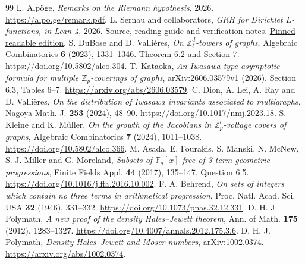\begin{thebibliography}{99}\small
{} L. Alpöge, \emph{Remarks on the Riemann hypothesis},
2026. \url{https://alpo.ge/remark.pdf}.
 L. Sernau and collaborators, \emph{GRH for Dirichlet
$L$-functions, in Lean 4}, 2026. Source, reading guide and verification
notes. \href{https://github.com/lsernau/grh-lean/tree/72fead102f663d5c7a407964a13dc0cf9d977207/grh}{Pinned readable edition}.
 S. DuBose and D. Vallières, \emph{On $\mathbb Z_\ell^d$-towers
of graphs}, Algebraic Combinatorics \textbf{6} (2023), 1331--1346.
Theorem 6.2 and Section 7. \url{https://doi.org/10.5802/alco.304}.
 T. Kataoka, \emph{An Iwasawa-type asymptotic formula for
multiple $\mathbb Z_p$-coverings of graphs}, arXiv:2606.03579v1 (2026).
Section 6.3, Tables 6--7. \url{https://arxiv.org/abs/2606.03579}.
 C. Dion, A. Lei, A. Ray and D. Vallières, \emph{On the
distribution of Iwasawa invariants associated to multigraphs}, Nagoya
Math. J. \textbf{253} (2024), 48--90. \url{https://doi.org/10.1017/nmj.2023.18}.
 S. Kleine and K. Müller, \emph{On the growth of the Jacobians
in $\mathbb Z_p^l$-voltage covers of graphs}, Algebraic Combinatorics
\textbf{7} (2024), 1011--1038. \url{https://doi.org/10.5802/alco.366}.
 M. Asada, E. Fourakis, S. Manski, N. McNew, S. J. Miller
and G. Moreland, \emph{Subsets of $\mathbb F_q[x]$ free of 3-term
geometric progressions}, Finite Fields Appl. \textbf{44} (2017), 135--147.
Question 6.5. \url{https://doi.org/10.1016/j.ffa.2016.10.002}.
 F. A. Behrend, \emph{On sets of integers which contain
no three terms in arithmetical progression}, Proc. Natl. Acad. Sci. USA
\textbf{32} (1946), 331--332. \url{https://doi.org/10.1073/pnas.32.12.331}.
 D. H. J. Polymath, \emph{A new proof of the density
Hales--Jewett theorem}, Ann. of Math. \textbf{175} (2012), 1283--1327.
\url{https://doi.org/10.4007/annals.2012.175.3.6}.
 D. H. J. Polymath, \emph{Density Hales--Jewett and
Moser numbers}, arXiv:1002.0374. \url{https://arxiv.org/abs/1002.0374}.
\end{thebibliography}
